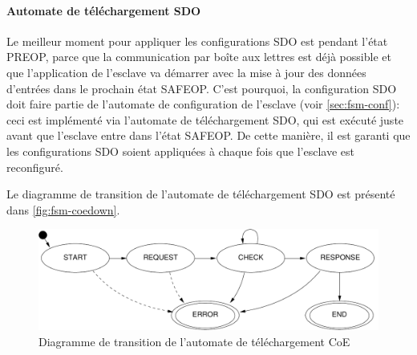 \documentclass[a4paper,12pt,BCOR6mm,bibtotoc,idxtotoc]{scrbook}
\begin{document}
\paragraph{Automate de t\'el\'echargement SDO}

Le meilleur moment pour appliquer les configurations SDO est pendant
l'\'etat PREOP, parce que la communication par bo\^ite aux lettres est
d\'ej\`a possible et que l'application de l'esclave va d\'emarrer avec
la mise \`a jour des donn\'ees d'entr\'ees dans le prochain \'etat
SAFEOP.  C'est pourquoi, la configuration SDO doit faire partie de
l'automate de configuration de l'esclave (voir
\autoref{sec:fsm-conf}): ceci est impl\'ement\'e via l'automate de
t\'el\'echargement SDO, qui est ex\'ecut\'e juste avant que l'esclave
entre dans l'\'etat SAFEOP.  De cette mani\`ere, il est garanti que
les configurations SDO soient appliqu\'ees \`a chaque fois que l'esclave
est reconfigur\'e.

Le diagramme de transition de l'automate de t\'el\'echargement SDO est
pr\'esent\'e dans \autoref{fig:fsm-coedown}.

\begin{figure}[htbp]
  \centering
  \includegraphics[width=.9\textwidth]{images/fsm-coedown} %
  \caption{Diagramme de transition de l'automate de t\'el\'echargement CoE}
  \label{fig:fsm-coedown}
\end{figure}

\end{document}
